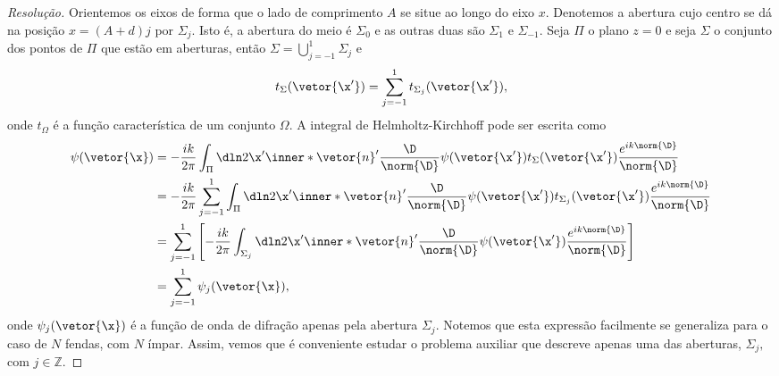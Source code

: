 \begin{proof}[Resolução]
    Orientemos os eixos de forma que o lado de comprimento \(A\) se situe ao longo do eixo \(x\). Denotemos a abertura cujo centro se dá na posição \(x = (A + d)j\) por \(\Sigma_j.\) Isto é, a abertura do meio é \(\Sigma_0\) e as outras duas são \(\Sigma_1\) e \(\Sigma_{-1}\). Seja \(\Pi\) o plano \(z = 0\) e seja \(\Sigma\) o conjunto dos pontos de \(\Pi\) que estão em aberturas, então \(\Sigma = \bigcup_{j = -1}^1 \Sigma_j\) e 
    \begin{equation*}
        t_{\Sigma}(\vetor{\x'}) = \sum_{j = -1}^1 t_{\Sigma_j}(\vetor{\x'}),
    \end{equation*}
    onde \(t_{\Omega}\) é a função característica de um conjunto \(\Omega\). A integral de Helmholtz-Kirchhoff pode ser escrita como
    \begin{align*}
        \psi(\vetor{\x}) &= - \frac{i k}{2\pi} \int_{\Pi} \dln2{\x'}  \inner*{\vetor{n}'}{\frac{\D}{\norm{\D}}} \psi(\vetor{\x'}) t_\Sigma(\vetor{\x'}) \frac{e^{ik \norm{\D}}}{\norm{\D}}\\
                         &= -\frac{i k}{2 \pi} \sum_{j = -1}^1 \int_{\Pi}  \dln2{\x'}  \inner*{\vetor{n}'}{\frac{\D}{\norm{\D}}} \psi(\vetor{\x'}) t_{\Sigma_j}(\vetor{\x'}) \frac{e^{ik \norm{\D}}}{\norm{\D}}\\
                         &= \sum_{j = -1}^1 \left[-\frac{ik}{2\pi} \int_{\Sigma_j} \dln2{\x'}  \inner*{\vetor{n}'}{\frac{\D}{\norm{\D}}} \psi(\vetor{\x'})  \frac{e^{ik \norm{\D}}}{\norm{\D}}\right]\\
                         &= \sum_{j = -1}^{1} \psi_j(\vetor{\x}),
    \end{align*}
    onde \(\psi_j(\vetor{\x})\) é a função de onda de difração apenas pela abertura \(\Sigma_j\). Notemos que esta expressão facilmente se generaliza para o caso de \(N\) fendas, com \(N\) ímpar. Assim, vemos que é conveniente estudar o problema auxiliar que descreve apenas uma das aberturas, \(\Sigma_j,\) com \(j \in \mathbb{Z}.\)


\end{proof}
